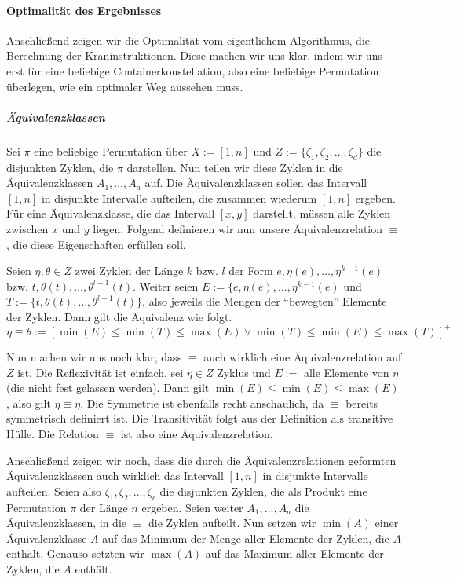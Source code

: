 \paragraph{Optimalität des Ergebnisses}
Anschließend zeigen wir die Optimalität vom eigentlichem Algorithmus, die Berechnung der Kraninstruktionen.
Diese machen wir uns klar, indem wir uns erst für eine beliebige Containerkonstellation, also eine beliebige Permutation überlegen, wie ein optimaler Weg aussehen muss.
\subparagraph{Äquivalenzklassen}
Sei $\pi$ eine beliebige Permutation über $X := [1,n]$ und $Z := \{\zeta_1, \zeta_2, \dots, \zeta_d\}$ die disjunkten Zyklen, die $\pi$ darstellen.
Nun teilen wir diese Zyklen in die Äquivalenzklassen $A_1, \dots, A_a$ auf.
Die Äquivalenzklassen sollen das Intervall $[1,n]$ in disjunkte Intervalle aufteilen, die zusammen wiederum $[1,n]$ ergeben.
Für eine Äquivalenzklasse, die das Intervall $[x,y]$ darstellt, müssen alle Zyklen zwischen $x$ und $y$ liegen.
Folgend definieren wir nun unsere Äquivalenzrelation $\equiv$, die diese Eigenschaften erfüllen soll.

Seien $\eta,\theta \in Z$ zwei Zyklen der Länge $k$ bzw. $l$ der Form $e, \eta(e), \dots, \eta^{k-1}(e)$ bzw. $t, \theta(t), \dots, \theta^{l-1}(t)$.
Weiter seien $E := \{e, \eta(e), \dots, \eta^{k-1}(e)$ und $T := \{t, \theta(t), \dots, \theta^{l-1}(t)\}$, also jeweils die Mengen der ``bewegten'' Elemente der Zyklen.
Dann gilt die Äquivalenz wie folgt.
\[ \eta \equiv \theta := [\min(E) \leq \min(T) \leq \max(E) \vee \min(T) \leq \min(E) \leq \max(T) ]^+ \]

Nun machen wir uns noch klar, dass $\equiv$ auch wirklich eine Äquivalenzrelation auf $Z$ ist.
Die Reflexivität ist einfach, sei $\eta \in Z$ Zyklus und $E := $ alle Elemente von $\eta$ (die nicht fest gelassen werden).
Dann gilt $\min(E) \leq \min(E) \leq \max(E)$, also gilt $\eta \equiv \eta$.
Die Symmetrie ist ebenfalls recht anschaulich, da $\equiv$ bereits symmetrisch definiert ist.
Die Transitivität folgt aus der Definition als transitive Hülle.
Die Relation $\equiv$ ist also eine Äquivalenzrelation.

Anschließend zeigen wir noch, dass die durch die Äquivalenzrelationen geformten Äquivalenzklassen auch wirklich das Intervall $[1,n]$ in
 disjunkte Intervalle aufteilen.
Seien also $\zeta_1, \zeta_2, \dots, \zeta_c$ die disjunkten Zyklen, die als Produkt eine Permutation $\pi$ der Länge $n$ ergeben.
Seien weiter $A_1, \dots, A_a$ die Äquivalenzklassen, in die $\equiv$ die Zyklen aufteilt.
Nun setzen wir $\min(A)$ einer Äquivalenzklasse $A$ auf das Minimum der Menge aller Elemente der Zyklen, die $A$ enthält.
Genauso setzten wir $\max(A)$ auf das Maximum aller Elemente der Zyklen, die $A$ enthält.


